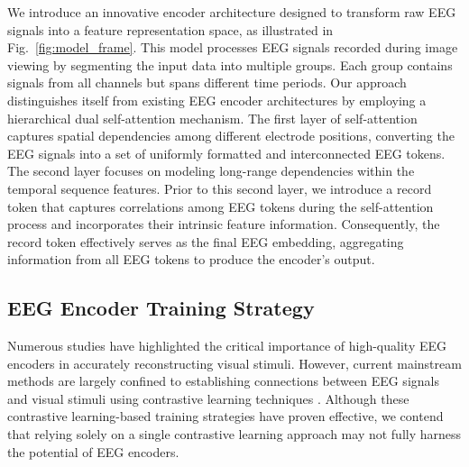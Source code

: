\documentclass[conference]{IEEEtran}
\begin{document}
We introduce an innovative encoder architecture designed to transform raw EEG signals into a feature representation space, as illustrated in Fig.~\ref{fig:model_frame}. This model processes EEG signals recorded during image viewing by segmenting the input data into multiple groups. Each group contains signals from all channels but spans different time periods. Our approach distinguishes itself from existing EEG encoder architectures by employing a hierarchical dual self-attention mechanism. The first layer of self-attention captures spatial dependencies among different electrode positions, converting the EEG signals into a set of uniformly formatted and interconnected EEG tokens. The second layer focuses on modeling long-range dependencies within the temporal sequence features. Prior to this second layer, we introduce a record token that captures correlations among EEG tokens during the self-attention process and incorporates their intrinsic feature information. Consequently, the record token effectively serves as the final EEG embedding, aggregating information from all EEG tokens to produce the encoder's output.

\subsection{EEG Encoder Training Strategy}\label{s2}
Numerous studies have highlighted the critical importance of high-quality EEG encoders in accurately reconstructing visual stimuli. However, current mainstream methods are largely confined to establishing connections between EEG signals and visual stimuli using contrastive learning techniques \cite{b29,b38}. Although these contrastive learning-based training strategies have proven effective, we contend that relying solely on a single contrastive learning approach may not fully harness the potential of EEG encoders. 
\end{document}
